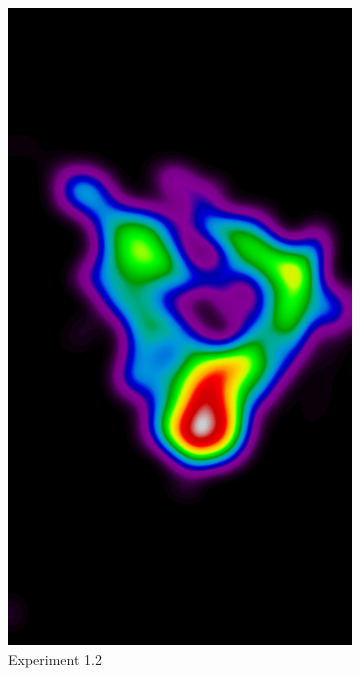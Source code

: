 \begin{figure}[h!]
\begin{subfigure}{0.195\textwidth}
			\includegraphics[width=\textwidth]{plots/examples/example5_probs_1_2.png}
		\caption{Experiment 1.2}
    \end{subfigure}
	\begin{subfigure}{0.195\textwidth}
		\centering

\end{subfigure}
\end{figure}
